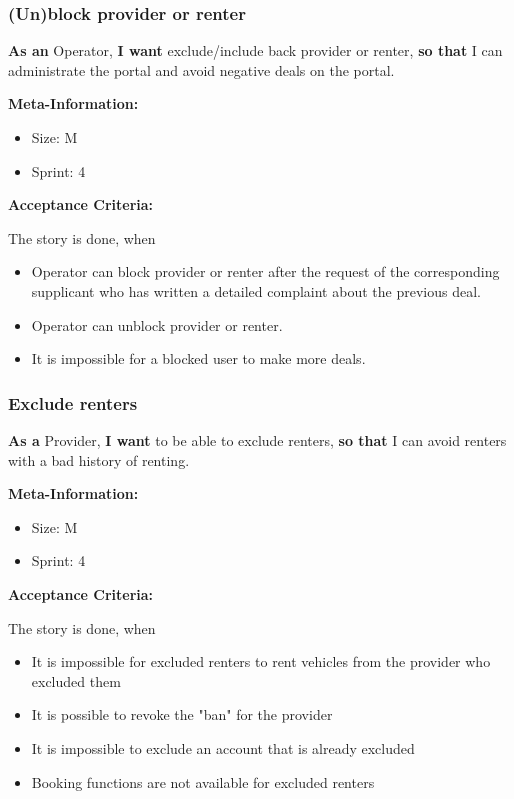 \subsubsection{(Un)block provider or renter}

\textbf{As an} Operator,\hfill\break
\textbf{I want} exclude/include back provider or renter,\hfill\break
\textbf{so that} I can administrate the portal and avoid negative deals on the portal.

\textbf{Meta-Information:}
\begin{itemize}
    \item Size: M
    \item Sprint: 4
\end{itemize}

\textbf{Acceptance Criteria:}

The story is done, when
\begin{itemize}
    \item Operator can block provider or renter after the request of the corresponding supplicant who has written a detailed complaint about the previous deal.
    \item Operator can unblock provider or renter.
    \item It is impossible for a blocked user to make more deals.
\end{itemize}


\subsubsection{Exclude renters}

\textbf{As a} Provider,\hfill\break
\textbf{I want} to be able to exclude renters,\hfill\break
\textbf{so that} I can avoid renters with a bad history of renting.

\textbf{Meta-Information:}
\begin{itemize}
    \item Size: M
    \item Sprint: 4
\end{itemize}

\textbf{Acceptance Criteria:}

The story is done, when
\begin{itemize}
    \item It is impossible for excluded renters to rent vehicles from the provider who excluded them
    \item It is possible to revoke the "ban" for the provider
    \item It is impossible to exclude an account that is already excluded
    \item Booking functions are not available for excluded renters
\end{itemize}


